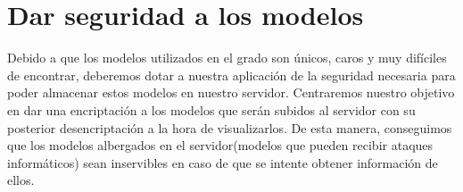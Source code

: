 \section{Dar seguridad a los modelos}
Debido a que los modelos utilizados en el grado son únicos, caros y muy difíciles de encontrar, deberemos dotar a nuestra aplicación de la seguridad necesaria para poder almacenar estos modelos en nuestro servidor. Centraremos nuestro objetivo en dar una encriptación a los modelos que serán subidos al servidor con su posterior desencriptación a la hora de visualizarlos. De esta manera, conseguimos que los modelos albergados en el servidor(modelos que pueden recibir ataques informáticos) sean inservibles en caso de que se intente obtener información de ellos.